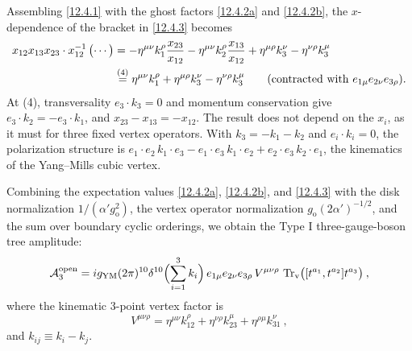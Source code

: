 \begin{tcolorbox}[breakable]
\begin{remark}
		Assembling \eqref{12.4.1} with the ghost factors \eqref{12.4.2a} and \eqref{12.4.2b}, the $x$-dependence of the bracket in \eqref{12.4.3} becomes
		\begin{align*}
			x_{12}x_{13}x_{23}\cdot x_{12}^{-1}\,\bigl(\cdots\bigr)
			&=-\eta^{\mu\nu}k_{1}^{\rho}\frac{x_{23}}{x_{12}}-\eta^{\mu\nu}k_{2}^{\rho}\frac{x_{13}}{x_{12}}+\eta^{\mu\rho}k_{3}^{\nu}-\eta^{\nu\rho}k_{3}^{\mu}\\
			&\overset{(4)}{=} \eta^{\mu\nu}k_{1}^{\rho}+\eta^{\mu\rho}k_{3}^{\nu}-\eta^{\nu\rho}k_{3}^{\mu}\qquad(\text{contracted with }e_{1\mu}e_{2\nu}e_{3\rho}) .
		\end{align*}
		At (4), transversality $e_{3}\cdot k_{3}=0$ and momentum conservation give $e_{3}\cdot k_{2}=-e_{3}\cdot k_{1}$, and $x_{23}-x_{13}=-x_{12}$. The result does not depend on the $x_{i}$, as it must for three fixed vertex operators. With $k_{3}=-k_{1}-k_{2}$ and $e_{i}\cdot k_{i}=0$, the polarization structure is $e_{1}\cdot e_{2}\,k_{1}\cdot e_{3}-e_{1}\cdot e_{3}\,k_{1}\cdot e_{2}+e_{2}\cdot e_{3}\,k_{2}\cdot e_{1}$, the kinematics of the Yang--Mills cubic vertex.
	\end{remark}
\end{tcolorbox}


Combining the expectation values \eqref{12.4.2a}, \eqref{12.4.2b}, and \eqref{12.4.3} with the disk normalization $1/(\alpha' g_{\mathrm{o}}^2)$, the vertex operator normalization $g_{\mathrm{o}}(2\alpha')^{-1/2}$, and the sum over boundary cyclic orderings, we obtain the Type I three-gauge-boson tree amplitude:
\begin{equation}
	\mathcal{A}_{3}^{\mathrm{open}} = i g_{\mathrm{YM}}(2\pi)^{10}\delta^{10}\Bigl(\sum_{i=1}^3 k_{i}\Bigr)\,e_{1\mu}e_{2\nu}e_{3\rho}\,V^{\mu\nu\rho}\,\operatorname{Tr}_{\mathrm{v}}\bigl([t^{a_{1}},t^{a_{2}}]t^{a_{3}}\bigr) \:, \label{12.4.4}
\end{equation}
where the kinematic 3-point vertex factor is
\begin{equation}
	V^{\mu\nu\rho} = \eta^{\mu\nu}k_{12}^{\rho} + \eta^{\nu\rho}k_{23}^{\mu} + \eta^{\rho\mu}k_{31}^{\nu} \:, \label{12.4.5}
\end{equation}
and $k_{ij} \equiv k_{i} - k_{j}$.

